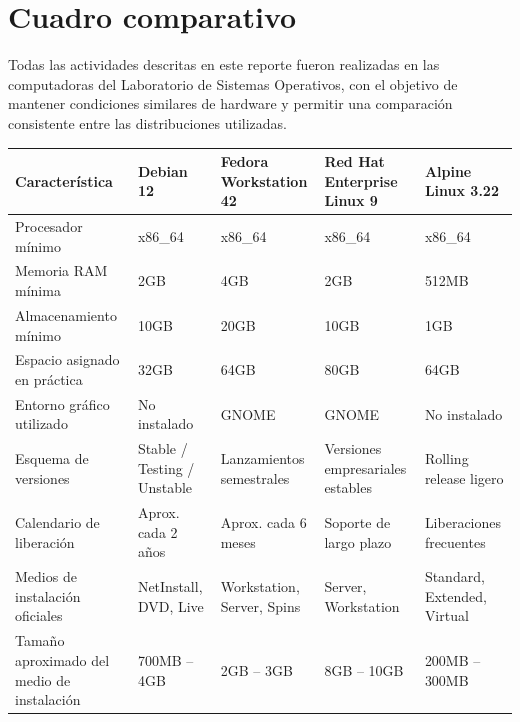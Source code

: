 \documentclass[11pt, letterpaper]{article}
\begin{document}
\section{Cuadro comparativo}
\label{sec:orgcomparativo}

Todas las actividades descritas en este reporte fueron realizadas en las computadoras del Laboratorio de Sistemas Operativos, con el objetivo de mantener condiciones similares de hardware y permitir una comparación consistente entre las distribuciones utilizadas.

\begin{center}
\scriptsize
\renewcommand{\arraystretch}{1.3}
\begin{tabular}{|p{3.1cm}|p{2.3cm}|p{2.3cm}|p{2.3cm}|p{2.3cm}|}
\hline
\textbf{Característica} &
\textbf{Debian 12} &
\textbf{Fedora Workstation 42} &
\textbf{Red Hat Enterprise Linux 9} &
\textbf{Alpine Linux 3.22} \\
\hline

Procesador mínimo &
x86\_64 &
x86\_64 &
x86\_64 &
x86\_64 \\
\hline

Memoria RAM mínima &
2GB &
4GB &
2GB &
512MB \\
\hline

Almacenamiento mínimo &
10GB &
20GB &
10GB &
1GB \\
\hline

Espacio asignado en práctica &
32GB &
64GB &
80GB &
64GB \\
\hline

Entorno gráfico utilizado &
No instalado &
GNOME &
GNOME &
No instalado \\
\hline

Esquema de versiones &
Stable / Testing / Unstable &
Lanzamientos semestrales &
Versiones empresariales estables &
Rolling release ligero \\
\hline

Calendario de liberación &
Aprox. cada 2 años &
Aprox. cada 6 meses &
Soporte de largo plazo &
Liberaciones frecuentes \\
\hline

Medios de instalación oficiales &
NetInstall, DVD, Live &
Workstation, Server, Spins &
Server, Workstation &
Standard, Extended, Virtual \\
\hline

Tamaño aproximado del medio de instalación &
700MB -- 4GB &
2GB -- 3GB &
8GB -- 10GB &
200MB -- 300MB \\
\hline


\end{tabular}
\end{center}
\end{document}
